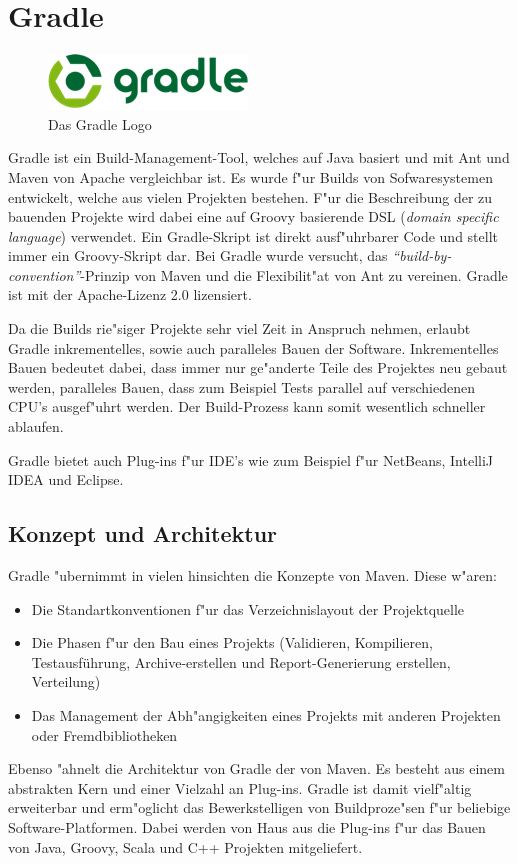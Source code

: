 \section{Gradle}
\begin{figure}[h]
	\begin{center}
		\includegraphics{./fig/gradle_logo.png}
		\caption{Das Gradle Logo}
		\label{fig:gradle_logo}
	\end{center}
\end{figure}
Gradle ist ein Build-Management-Tool, welches auf Java basiert und mit Ant und Maven von Apache vergleichbar ist. Es wurde f"ur Builds  von Sofwaresystemen entwickelt, welche aus vielen Projekten bestehen.
F"ur die Beschreibung der zu bauenden Projekte wird dabei eine auf Groovy basierende DSL (\textit{domain specific language}) verwendet.
Ein Gradle-Skript ist direkt ausf"uhrbarer Code und stellt immer ein Groovy-Skript dar.
Bei Gradle wurde versucht, das \textit{``build-by-convention''}-Prinzip von Maven und die Flexibilit"at von Ant zu vereinen.
Gradle ist mit der Apache-Lizenz 2.0 lizensiert.

Da die Builds rie"siger Projekte sehr viel Zeit in Anspruch nehmen, erlaubt Gradle inkrementelles, sowie auch paralleles Bauen der Software.
Inkrementelles Bauen bedeutet dabei, dass immer nur ge"anderte Teile des Projektes neu gebaut werden, paralleles Bauen, dass zum Beispiel Tests parallel auf verschiedenen CPU's ausgef"uhrt werden.
Der Build-Prozess kann somit wesentlich schneller ablaufen.

Gradle bietet auch Plug-ins f"ur IDE's wie zum Beispiel f"ur NetBeans, IntelliJ IDEA und Eclipse.

\subsection{Konzept und Architektur}
Gradle "ubernimmt in vielen hinsichten die Konzepte von Maven. Diese w"aren:
\begin{itemize}
	\item Die Standartkonventionen f"ur das Verzeichnislayout der Projektquelle
	\item Die Phasen f"ur den Bau eines Projekts (Validieren, Kompilieren, Testausführung, Archive-erstellen und Report-Generierung erstellen, Verteilung)
	\item Das Management der Abh"angigkeiten eines Projekts mit anderen Projekten oder Fremdbibliotheken
\end{itemize}
Ebenso "ahnelt die Architektur von Gradle der von Maven.
Es besteht aus einem abstrakten Kern und einer Vielzahl an Plug-ins. Gradle ist damit vielf"altig erweiterbar und erm"oglicht das Bewerkstelligen von Buildproze"sen f"ur beliebige Software-Platformen.
Dabei werden von Haus aus die Plug-ins f"ur das Bauen von Java, Groovy, Scala und C++ Projekten mitgeliefert.

